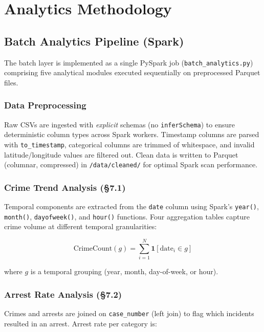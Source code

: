 \documentclass[11pt,a4paper]{article}
\begin{document}
\section{Analytics Methodology}

\subsection{Batch Analytics Pipeline (Spark)}

The batch layer is implemented as a single PySpark job
(\texttt{batch\_analytics.py}) comprising five analytical modules executed
sequentially on preprocessed Parquet files.

\subsubsection{Data Preprocessing}
Raw CSVs are ingested with \emph{explicit} schemas (no \texttt{inferSchema})
to ensure deterministic column types across Spark workers. Timestamp
columns are parsed with \texttt{to\_timestamp}, categorical columns are
trimmed of whitespace, and invalid latitude/longitude values are filtered
out. Clean data is written to Parquet (columnar, compressed) in
\texttt{/data/cleaned/} for optimal Spark scan performance.

\subsubsection{Crime Trend Analysis (§7.1)}
Temporal components are extracted from the \texttt{date} column using
Spark's \texttt{year()}, \texttt{month()}, \texttt{dayofweek()}, and
\texttt{hour()} functions. Four aggregation tables capture crime volume
at different temporal granularities:

\begin{equation}
\text{CrimeCount}(g) = \sum_{i=1}^{N} \mathbf{1}[\text{date}_i \in g]
\end{equation}

where $g$ is a temporal grouping (year, month, day-of-week, or hour).

\subsubsection{Arrest Rate Analysis (§7.2)}
Crimes and arrests are joined on \texttt{case\_number} (left join) to
flag which incidents resulted in an arrest. Arrest rate per category is:
\end{document}
